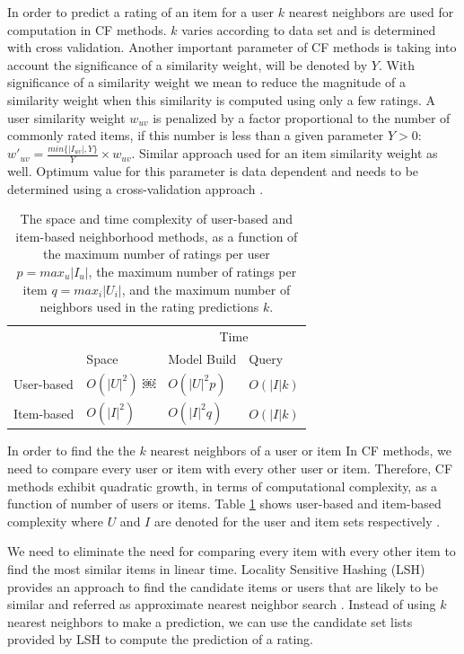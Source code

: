 \documentclass[conference]{IEEEtran}
\begin{document}
In order to predict a rating of an item for a user $k$ nearest neighbors are 
used for computation in CF methods. $k$ varies according to data set and is 
determined with cross validation. Another important parameter of CF methods 
is taking into account the significance of a similarity weight, will be denoted 
by $Y$. With significance of a similarity weight we mean to reduce the magnitude 
of a similarity weight when this similarity is computed using only a few 
ratings. A user similarity weight $w_{uv}$ is penalized by a factor proportional to the number 
of commonly rated items, if this number is less than a given parameter $Y > 0$:
$w'_{uv} = \frac {min\{|I_{uv}|, Y \} } Y \times w_{uv}$. Similar approach used for an item
similarity weight as well. Optimum value for this parameter is 
data dependent and needs to be determined using a cross-validation approach
 \cite{DBLP:reference/rsh/DesrosiersK11}.

\begin{table}
\centering
\begin{tabular}{llll}
\hline
& & \multicolumn {2}{c}{Time} \\
\cline{3-4}
     & Space & Model Build  & Query \\
\hline
User-based & $O(|U|^2)$ ￼& $O(|U|^2 p)$ &$O(|I|k)$ \\
Item-based & $O(|I|^2)$ & $O(|I|^2q)$ & $O(|I|k)$   \\
\hline
\end{tabular}
\caption{The space and time complexity of user-based and item-based 
neighborhood methods, as a function of the maximum number of ratings per user
$p = max_{u}|I_{u}|$, the maximum number of ratings per item 
$q = max_{i}|U_{i}|$, and the maximum number of neighbors used in the rating
predictions $k$.}
\label{table:complexity}
\end{table}
In order to find the the $k$ nearest neighbors of a user or item In CF methods, 
we need to compare every user or item with every other user or item. 
Therefore, CF methods exhibit quadratic growth,  in terms of computational 
complexity,  as a function of number of users or items. Table \ref{table:complexity} 
shows user-based and item-based complexity where $U$ and $I$ are denoted for 
the user and item sets respectively \cite{DBLP:reference/rsh/DesrosiersK11}.

We need to eliminate the need for comparing every item with  every other item 
to find the most similar items in linear time. Locality Sensitive Hashing (LSH) 
provides an approach to find the candidate items or users that are likely to be similar 
and referred as approximate nearest neighbor search \cite{Rajaraman:2011:MMD:2124405}.
Instead of using $k$ nearest neighbors to make a prediction, we can use the candidate 
set lists provided by LSH to compute the prediction of a rating. 
 
\end{document}
